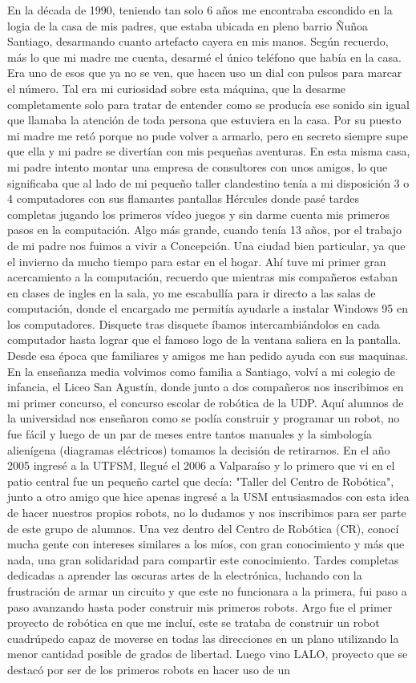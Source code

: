 En la década de 1990, teniendo tan solo 6 años me encontraba escondido en la logia de la casa de mis padres, que estaba ubicada en pleno barrio Ñuñoa Santiago, desarmando cuanto artefacto cayera en mis manos. Según recuerdo, más lo que mi madre me cuenta, desarmé el único teléfono que había en la casa. Era uno de esos que ya no se ven, que hacen uso un dial con pulsos para marcar el número. Tal era mi curiosidad sobre esta máquina, que la desarme completamente solo para tratar de entender como se producía ese sonido sin igual que llamaba la atención de toda persona que estuviera en la casa. Por su puesto mi madre me retó porque no pude volver a armarlo, pero en secreto siempre supe que ella y mi padre se divertían con mis pequeñas aventuras. En esta misma casa, mi padre intento montar una empresa de consultores con unos amigos, lo que significaba que al lado de mi pequeño taller clandestino tenía a mi disposición 3 o 4 computadores con sus flamantes pantallas Hércules donde pasé tardes completas jugando los primeros vídeo juegos y sin darme cuenta mis primeros pasos en la computación. Algo más grande, cuando tenía 13 años, por el trabajo de mi padre nos fuimos a vivir a Concepción. Una ciudad bien particular, ya que el invierno da mucho tiempo para estar en el hogar. Ahí tuve mi primer gran acercamiento a la computación, recuerdo que mientras mis compañeros estaban en clases de ingles en la sala, yo me escabullía para ir directo a las salas de computación, donde el encargado me permitía ayudarle a instalar Windows 95 en los computadores. Disquete tras disquete íbamos intercambiándolos en cada computador hasta lograr que el famoso logo de la ventana saliera en la pantalla. Desde esa época que familiares y amigos me han pedido ayuda con sus maquinas. En la enseñanza media volvimos como familia a Santiago, volví a mi colegio de infancia, el Liceo San Agustín, donde junto a dos compañeros nos inscribimos en mi primer concurso, el concurso escolar de robótica de la UDP. Aquí alumnos de la universidad nos enseñaron como se podía construir y programar un robot, no fue fácil y luego de un par de meses entre tantos manuales y la simbología alienígena (diagramas eléctricos) tomamos la decisión de retirarnos. En el año 2005 ingresé a la UTFSM, llegué el 2006 a Valparaíso y lo primero que vi en el patio central fue un pequeño cartel que decía: "Taller del Centro de Robótica", junto a otro amigo que hice apenas ingresé a la USM entusiasmados con esta idea de hacer nuestros propios robots, no lo dudamos y nos inscribimos para ser parte de este grupo de alumnos. Una vez dentro del Centro de Robótica (CR), conocí mucha gente con intereses similares a los míos, con gran conocimiento y más que nada, una gran solidaridad para compartir este conocimiento. Tardes completas dedicadas a aprender las oscuras artes de la electrónica, luchando con la frustración de armar un circuito y que este no funcionara a la primera, fui paso a paso avanzando hasta poder construir mis primeros robots. Argo fue el primer proyecto de robótica en que me incluí, este se trataba de construir un robot cuadrúpedo capaz de moverse en todas las direcciones en un plano utilizando la menor cantidad posible de grados de libertad. Luego vino LALO, proyecto que se destacó por ser de los primeros robots en hacer uso de un 
